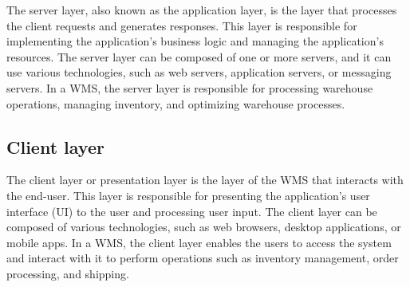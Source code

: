 The server layer, also known as the application layer, is the layer that processes the client requests and generates responses. This layer is responsible for implementing the application's business logic and managing the application's resources. The server layer can be composed of one or more servers, and it can use various technologies, such as web servers, application servers, or messaging servers. In a WMS, the server layer is responsible for processing warehouse operations, managing inventory, and optimizing warehouse processes.

\subsection{Client layer}

The client layer or presentation layer is the layer of the WMS that interacts with the end-user. This layer is responsible for presenting the application's user interface (UI) to the user and processing user input. The client layer can be composed of various technologies, such as web browsers, desktop applications, or mobile apps. In a WMS, the client layer enables the users to access the system and interact with it to perform operations such as inventory management, order processing, and shipping.
